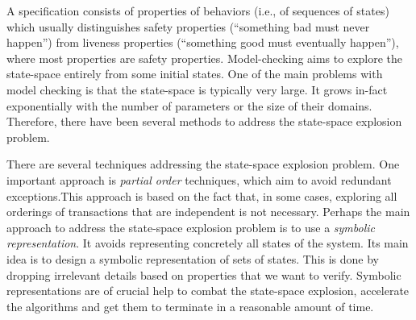 A specification consists of properties of behaviors (i.e., of sequences of states) which usually distinguishes safety properties (``something bad must never happen'') from liveness properties (``something good must eventually happen''), where
   most properties are safety properties.
Model-checking aims to explore the state-space entirely from some initial states.
One of the main problems with model checking is that the state-space is typically very
  large. It grows in-fact
exponentially with the number of parameters or the size of their
domains. Therefore, there have been several methods to address the
state-space explosion problem.

                   
There are several techniques addressing the state-space explosion problem.
One important approach is \emph{partial order} techniques, which aim to avoid
redundant exceptions.This approach is based on the fact that, in some cases, exploring all orderings of transactions that are independent is not necessary. Perhaps the main approach to address the state-space explosion problem is to use a
\emph{symbolic
  representation}. It avoids
   representing concretely all states of the system. 
Its main idea is to design a symbolic representation of sets of states.
This is done by dropping irrelevant details based on properties that we want to verify. Symbolic representations are of crucial help to combat the state-space explosion, accelerate the algorithms and get them to terminate in a reasonable amount of time.


